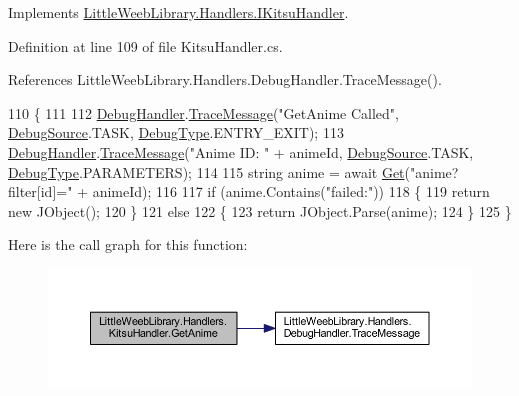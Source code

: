 Implements \mbox{\hyperlink{interface_little_weeb_library_1_1_handlers_1_1_i_kitsu_handler_a85c4f22da758a475c55327fa6393935c}{Little\+Weeb\+Library.\+Handlers.\+I\+Kitsu\+Handler}}.



Definition at line 109 of file Kitsu\+Handler.\+cs.



References Little\+Weeb\+Library.\+Handlers.\+Debug\+Handler.\+Trace\+Message().


\begin{DoxyCode}
110         \{
111 
112             \mbox{\hyperlink{class_little_weeb_library_1_1_handlers_1_1_kitsu_handler_a6d3c55fa5eee15320845c2d902c96882}{DebugHandler}}.\mbox{\hyperlink{interface_little_weeb_library_1_1_handlers_1_1_i_debug_handler_a2e405bc3492e683cd3702fae125221bc}{TraceMessage}}(\textcolor{stringliteral}{"GetAnime Called"}, 
      \mbox{\hyperlink{namespace_little_weeb_library_1_1_handlers_a2a6ca0775121c9c503d58aa254d292be}{DebugSource}}.TASK, \mbox{\hyperlink{namespace_little_weeb_library_1_1_handlers_ab66019ed40462876ec4e61bb3ccb0a62}{DebugType}}.ENTRY\_EXIT);
113             \mbox{\hyperlink{class_little_weeb_library_1_1_handlers_1_1_kitsu_handler_a6d3c55fa5eee15320845c2d902c96882}{DebugHandler}}.\mbox{\hyperlink{interface_little_weeb_library_1_1_handlers_1_1_i_debug_handler_a2e405bc3492e683cd3702fae125221bc}{TraceMessage}}(\textcolor{stringliteral}{"Anime ID: "} + animeId, 
      \mbox{\hyperlink{namespace_little_weeb_library_1_1_handlers_a2a6ca0775121c9c503d58aa254d292be}{DebugSource}}.TASK, \mbox{\hyperlink{namespace_little_weeb_library_1_1_handlers_ab66019ed40462876ec4e61bb3ccb0a62}{DebugType}}.PARAMETERS);
114 
115             \textcolor{keywordtype}{string} anime = await \mbox{\hyperlink{class_little_weeb_library_1_1_handlers_1_1_kitsu_handler_a8b7c629a03096c3152252f6b5cf2937f}{Get}}(\textcolor{stringliteral}{"anime?filter[id]="} + animeId);
116 
117             \textcolor{keywordflow}{if} (anime.Contains(\textcolor{stringliteral}{"failed:"}))
118             \{
119                 \textcolor{keywordflow}{return} \textcolor{keyword}{new} JObject();
120             \}
121             \textcolor{keywordflow}{else}
122             \{
123                 \textcolor{keywordflow}{return} JObject.Parse(anime);
124             \}
125         \}
\end{DoxyCode}
Here is the call graph for this function\+:\nopagebreak
\begin{figure}[H]
\begin{center}
\leavevmode
\includegraphics[width=350pt]{class_little_weeb_library_1_1_handlers_1_1_kitsu_handler_a4c88ed25befe2904416b4d90673a8f82_cgraph}
\end{center}
\end{figure}
